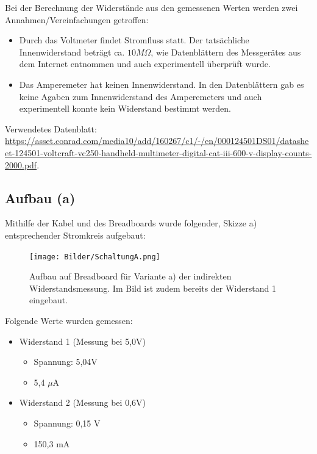\documentclass[
  9pt,
]{article}
\begin{document}
Bei der Berechnung der Widerstände aus den gemessenen Werten werden zwei
Annahmen/Vereinfachungen getroffen:

\begin{itemize}
  \item Durch das Voltmeter findet Stromfluss statt. Der tatsächliche Innenwiderstand beträgt ca. $10M\Omega$, wie Datenblättern des Messgerätes aus dem Internet entnommen und auch experimentell überprüft wurde.
  \item Das Amperemeter hat keinen Innenwiderstand. In den Datenblättern gab es keine Agaben zum Innenwiderstand des Amperemeters und auch experimentell konnte kein Widerstand bestimmt werden.
\end{itemize}

Verwendetes Datenblatt:
\url{https://asset.conrad.com/media10/add/160267/c1/-/en/000124501DS01/datasheet-124501-voltcraft-vc250-handheld-multimeter-digital-cat-iii-600-v-display-counts-2000.pdf}.

\hypertarget{aufbau-a}{%
\subsection{Aufbau (a)}\label{aufbau-a}}

Mithilfe der Kabel und des Breadboards wurde folgender, Skizze a)
entsprechender Stromkreis aufgebaut:

\begin{figure}
\centering
\texttt{[image: Bilder/SchaltungA.png]}
\caption{Aufbau auf Breadboard für Variante a) der indirekten
Widerstandsmessung. Im Bild ist zudem bereits der Widerstand 1
eingebaut.}
\end{figure}

\newpage

Folgende Werte wurden gemessen:

\begin{itemize}
\item {Widerstand 1 (Messung bei 5,0V)}
\begin{itemize}
\item {Spannung: 5,04V}
\item {5,4 $\mu$A}
\end{itemize}
\item {Widerstand 2 (Messung bei 0,6V)}
\begin{itemize}
\item {Spannung: 0,15 V}
\item {150,3 mA}
\end{itemize}
\end{itemize}
\end{document}
